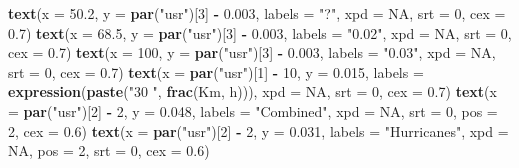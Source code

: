 \documentclass[12pt,oneside]{reedthesis}
\newenvironment{Shaded}{\begin{snugshade}}{\end{snugshade}}
\newcommand{\DataTypeTok}[1]{\textcolor[rgb]{0.13,0.29,0.53}{#1}}
\newcommand{\DecValTok}[1]{\textcolor[rgb]{0.00,0.00,0.81}{#1}}
\newcommand{\FloatTok}[1]{\textcolor[rgb]{0.00,0.00,0.81}{#1}}
\newcommand{\KeywordTok}[1]{\textcolor[rgb]{0.13,0.29,0.53}{\textbf{#1}}}
\newcommand{\NormalTok}[1]{#1}
\newcommand{\OperatorTok}[1]{\textcolor[rgb]{0.81,0.36,0.00}{\textbf{#1}}}
\newcommand{\OtherTok}[1]{\textcolor[rgb]{0.56,0.35,0.01}{#1}}
\newcommand{\StringTok}[1]{\textcolor[rgb]{0.31,0.60,0.02}{#1}}
\begin{document}
\begin{Shaded}
\begin{Highlighting}[]
  \KeywordTok{text}\NormalTok{(}\DataTypeTok{x =} \FloatTok{50.2}\NormalTok{,  }\DataTypeTok{y =} \KeywordTok{par}\NormalTok{(}\StringTok{"usr"}\NormalTok{)[}\DecValTok{3}\NormalTok{] }\OperatorTok{-}\StringTok{ }\FloatTok{0.003}\NormalTok{, }\DataTypeTok{labels =} \StringTok{"?"}\NormalTok{, }\DataTypeTok{xpd =} \OtherTok{NA}\NormalTok{, }\DataTypeTok{srt =} \DecValTok{0}\NormalTok{, }\DataTypeTok{cex =} \FloatTok{0.7}\NormalTok{)}
  \KeywordTok{text}\NormalTok{(}\DataTypeTok{x =} \FloatTok{68.5}\NormalTok{,  }\DataTypeTok{y =} \KeywordTok{par}\NormalTok{(}\StringTok{"usr"}\NormalTok{)[}\DecValTok{3}\NormalTok{] }\OperatorTok{-}\StringTok{ }\FloatTok{0.003}\NormalTok{, }\DataTypeTok{labels =} \StringTok{"0.02"}\NormalTok{, }\DataTypeTok{xpd =} \OtherTok{NA}\NormalTok{, }\DataTypeTok{srt =} \DecValTok{0}\NormalTok{, }\DataTypeTok{cex =} \FloatTok{0.7}\NormalTok{)}
  \KeywordTok{text}\NormalTok{(}\DataTypeTok{x =} \DecValTok{100}\NormalTok{,  }\DataTypeTok{y =} \KeywordTok{par}\NormalTok{(}\StringTok{"usr"}\NormalTok{)[}\DecValTok{3}\NormalTok{] }\OperatorTok{-}\StringTok{ }\FloatTok{0.003}\NormalTok{, }\DataTypeTok{labels =} \StringTok{"0.03"}\NormalTok{, }\DataTypeTok{xpd =} \OtherTok{NA}\NormalTok{, }\DataTypeTok{srt =} \DecValTok{0}\NormalTok{, }\DataTypeTok{cex =} \FloatTok{0.7}\NormalTok{)}
  \KeywordTok{text}\NormalTok{(}\DataTypeTok{x =} \KeywordTok{par}\NormalTok{(}\StringTok{"usr"}\NormalTok{)[}\DecValTok{1}\NormalTok{] }\OperatorTok{-}\StringTok{ }\DecValTok{10}\NormalTok{,  }\DataTypeTok{y =} \FloatTok{0.015}\NormalTok{, }\DataTypeTok{labels =} \KeywordTok{expression}\NormalTok{(}\KeywordTok{paste}\NormalTok{(}\StringTok{"30 "}\NormalTok{, }\KeywordTok{frac}\NormalTok{(Km, h))), }\DataTypeTok{xpd =} \OtherTok{NA}\NormalTok{, }\DataTypeTok{srt =} \DecValTok{0}\NormalTok{, }\DataTypeTok{cex =} \FloatTok{0.7}\NormalTok{)}
  \KeywordTok{text}\NormalTok{(}\DataTypeTok{x =} \KeywordTok{par}\NormalTok{(}\StringTok{"usr"}\NormalTok{)[}\DecValTok{2}\NormalTok{] }\OperatorTok{-}\StringTok{ }\DecValTok{2}\NormalTok{,  }\DataTypeTok{y =} \FloatTok{0.048}\NormalTok{, }\DataTypeTok{labels =} \StringTok{"Combined"}\NormalTok{, }\DataTypeTok{xpd =} \OtherTok{NA}\NormalTok{, }\DataTypeTok{srt =} \DecValTok{0}\NormalTok{, }\DataTypeTok{pos =} \DecValTok{2}\NormalTok{, }\DataTypeTok{cex =} \FloatTok{0.6}\NormalTok{)}
  \KeywordTok{text}\NormalTok{(}\DataTypeTok{x =} \KeywordTok{par}\NormalTok{(}\StringTok{"usr"}\NormalTok{)[}\DecValTok{2}\NormalTok{] }\OperatorTok{-}\StringTok{ }\DecValTok{2}\NormalTok{,  }\DataTypeTok{y =} \FloatTok{0.031}\NormalTok{, }\DataTypeTok{labels =} \StringTok{"Hurricanes"}\NormalTok{, }\DataTypeTok{xpd =} \OtherTok{NA}\NormalTok{, }\DataTypeTok{pos =} \DecValTok{2}\NormalTok{, }\DataTypeTok{srt =} \DecValTok{0}\NormalTok{, }\DataTypeTok{cex =} \FloatTok{0.6}\NormalTok{)}

\end{Highlighting}
\end{Shaded}
\end{document}
